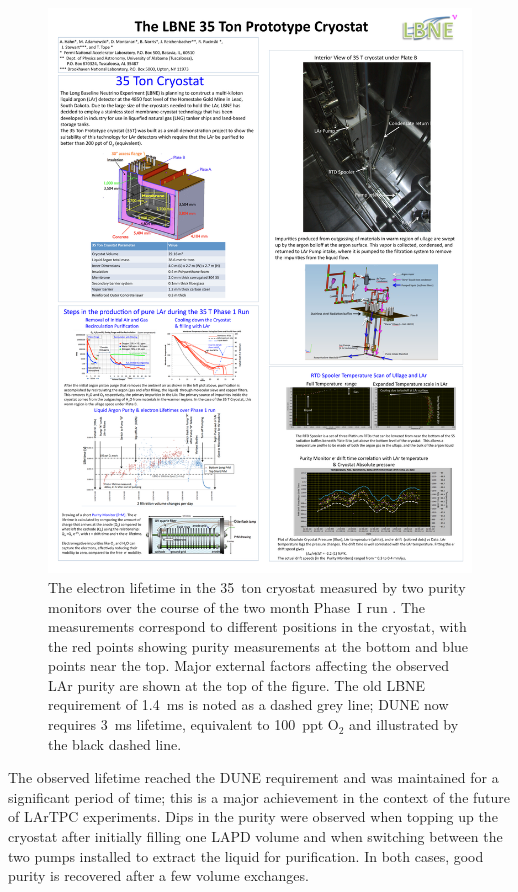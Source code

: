 \begin{figure}
  \centering
  \includegraphics[width=14cm]{35tonPhaseIElectronLifetime.pdf}
  \caption[The electron lifetime in the 35~ton cryostat measured by two purity monitors over the course of the two month Phase~I run.]{The electron lifetime in the 35~ton cryostat measured by two purity monitors over the course of the two month Phase~I run \cite{35tonPhaseI2014}.  The measurements correspond to different positions in the cryostat, with the red points showing purity measurements at the bottom and blue points near the top.  Major external factors affecting the observed LAr purity are shown at the top of the figure.  The old LBNE requirement of 1.4~ms is noted as a dashed grey line; DUNE now requires 3~ms lifetime, equivalent to 100~ppt O$_2$ and illustrated by the black dashed line.}
  \label{fig:35tonPhaseIElectronLifetime}
\end{figure}

The observed lifetime reached the DUNE requirement and was maintained for a significant period of time; this is a major achievement in the context of the future of LArTPC experiments.  Dips in the purity were observed when topping up the cryostat after initially filling one LAPD volume and when switching between the two pumps installed to extract the liquid for purification.  In both cases, good purity is recovered after a few volume exchanges.

